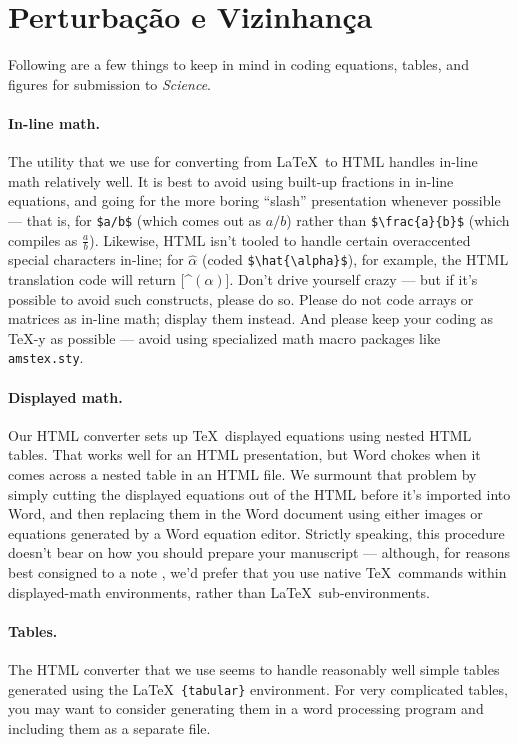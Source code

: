 \documentclass[12pt]{article}
\begin{document}
	

\section*{Perturbação e Vizinhança}

Following are a few things to keep in mind in coding equations,
tables, and figures for submission to {\it Science}.

\paragraph*{In-line math.}  The utility that we use for converting
from \LaTeX\ to HTML handles in-line math relatively well.  It is best
to avoid using built-up fractions in in-line equations, and going for
the more boring ``slash'' presentation whenever possible --- that is,
for \verb+$a/b$+ (which comes out as $a/b$) rather than
\verb+$\frac{a}{b}$+ (which compiles as $\frac{a}{b}$).  Likewise,
HTML isn't tooled to handle certain overaccented special characters
in-line; for $\hat{\alpha}$ (coded \verb+$\hat{\alpha}$+), for
example, the HTML translation code will return [\^{}$(\alpha)$].
Don't drive yourself crazy --- but if it's possible to avoid such
constructs, please do so.  Please do not code arrays or matrices as
in-line math; display them instead.  And please keep your coding as
\TeX-y as possible --- avoid using specialized math macro packages
like \texttt{amstex.sty}.

\paragraph*{Displayed math.} Our HTML converter sets up \TeX\
displayed equations using nested HTML tables.  That works well for an
HTML presentation, but Word chokes when it comes across a nested
table in an HTML file.  We surmount that problem by simply cutting the
displayed equations out of the HTML before it's imported into Word,
and then replacing them in the Word document using either images or
equations generated by a Word equation editor.  Strictly speaking,
this procedure doesn't bear on how you should prepare your manuscript
--- although, for reasons best consigned to a note \cite{nattex}, we'd
prefer that you use native \TeX\ commands within displayed-math
environments, rather than \LaTeX\ sub-environments.

\paragraph*{Tables.}  The HTML converter that we use seems to handle
reasonably well simple tables generated using the \LaTeX\
\texttt{\{tabular\}} environment.  For very complicated tables, you
may want to consider generating them in a word processing program and
including them as a separate file.
\end{document}

